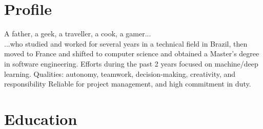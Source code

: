 \documentclass[letterpaper]{twentysecondcv} %
\begin{document}
\makeprofile %


\section{Profile}

A father, a geek, a traveller, a cook, a gamer... \\ ...who studied and
worked for several years in a technical field in Brazil, then moved to France
and shifted to computer science and obtained a Master’s degree in software
engineering. Efforts during the past 2 years focused on machine/deep learning.
Qualities: autonomy, teamwork, decision-making, creativity, and responsibility
Reliable for project management, and high commitment in duty.





\section{Education}
\end{document}

